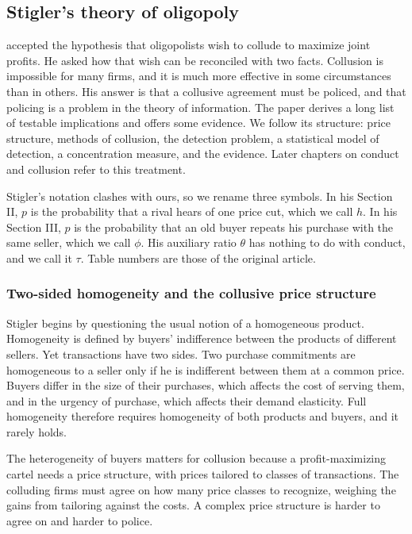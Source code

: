 \subsection{Stigler's theory of oligopoly}\label{sec:02-stigler}

\citet{Stigler1964} accepted the hypothesis that oligopolists wish to collude to maximize joint profits. He asked
how that wish can be reconciled with two facts. Collusion is impossible for many firms, and it is much more
effective in some circumstances than in others. His answer is that a collusive agreement must be policed, and that
policing is a problem in the theory of information. The paper derives a long list of testable implications and
offers some evidence. We follow its structure: price structure, methods of collusion, the detection problem, a
statistical model of detection, a concentration measure, and the evidence. Later chapters on conduct and
collusion refer to this treatment.

Stigler's notation clashes with ours, so we rename three symbols. In his Section II, $p$ is the probability that a
rival hears of one price cut, which we call $h$. In his Section III, $p$ is the probability that an old buyer repeats
his purchase with the same seller, which we call $\phi$. His auxiliary ratio $\theta$ has nothing to do with conduct,
and we call it $\tau$. Table numbers are those of the original article.

\subsubsection{Two-sided homogeneity and the collusive price structure}

Stigler begins by questioning the usual notion of a homogeneous product. Homogeneity is defined by buyers'
indifference between the products of different sellers. Yet transactions have two sides. Two purchase commitments
are homogeneous to a seller only if he is indifferent between them at a common price. Buyers differ in the size of
their purchases, which affects the cost of serving them, and in the urgency of purchase, which affects their demand
elasticity. Full homogeneity therefore requires homogeneity of both products and buyers, and it rarely holds.

The heterogeneity of buyers matters for collusion because a profit-maximizing cartel needs a price structure, with
prices tailored to classes of transactions. The colluding firms must agree on how many price classes to recognize,
weighing the gains from tailoring against the costs. A complex price structure is harder to agree on and harder to
police.

